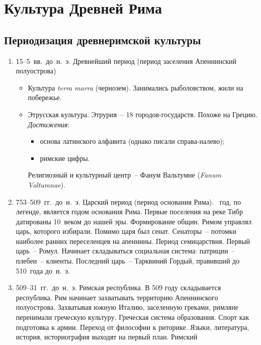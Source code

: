 \chapter{Культура Древней Рима}
\section{Периодизация древнеримской культуры}

  \begin{enumerate}
    \item 15--5~вв.~до~н.~э. Древнейший период (период заселения Апеннинский
      полуострова)
      \begin{itemize}
        \item Культура \emph{terra marra} (чернозем). Занимались рыболовством,
          жили на побережье.
        \item Этрусская культура. Этрурия~-- 18 городов-государств. Похоже на
          Грецию.
          \emph{Достижения}:
            \begin{itemize}
              \item основа латинского алфавита (однако писали справа-налево);
              \item римские цифры.
            \end{itemize}
          Религиозный и культурный центр~-- Фанум Вальтумне
            (\emph{Fanum Voltumnae}).
      \end{itemize}
    \item 753--509~гг.~до~н.~э. Царский период (период основания Рима).
      ~год, по легенде, является годом основания Рима. Первые поселения на
      реке Тибр датированы 10~веком до нашей эры. Формирование общин. Римом
      управлял царь, которого избирали. Помимо царя был сенат. Сенаторы~--
      потомки наиболее ранних переселенцев на апеннины.
      \medskip
      Период семицарствия. Первый царь~-- Ромул. Начинает складываться
      социальная система: патриции~-- плебеи~-- клиенты.
      \medskip
      Последний царь~-- Тарквиний Гордый, правивший до 510~года до~н.~э.
    \item 509--31~гг.~до~н.~э. Римская республика.
      \medskip
      В 509 году складывается республика. Рим начинает захватывать территорию
      Апеннинского полуострова. Захватывая южную Италию, заселенную греками,
      римляне перенимали греческую культуру. Греческая система образования.
      Спорт как подготовка к армии. Переход от философии к риторике. Языки,
      литература, история, историография выходят на первый план. Римский

\end{enumerate}
